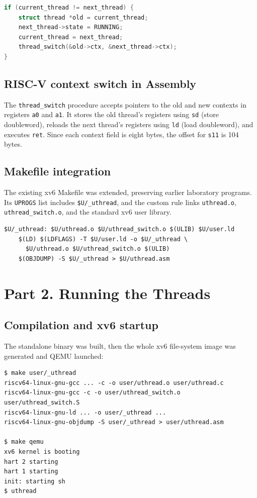 \documentclass[12pt,a4paper]{article}
\begin{document}
\begin{lstlisting}[style=source,language=C]
if (current_thread != next_thread) {
    struct thread *old = current_thread;
    next_thread->state = RUNNING;
    current_thread = next_thread;
    thread_switch(&old->ctx, &next_thread->ctx);
}
\end{lstlisting}

\subsection{RISC-V context switch in Assembly}
The \texttt{thread\_switch} procedure accepts pointers to the old and new contexts in registers \texttt{a0} and \texttt{a1}. It stores the old thread's registers using \texttt{sd} (store doubleword), reloads the next thread's registers using \texttt{ld} (load doubleword), and executes \texttt{ret}. Since each context field is eight bytes, the offset for \texttt{s11} is 104 bytes.



\subsection{Makefile integration}
The existing xv6 Makefile was extended, preserving earlier laboratory programs. Its \texttt{UPROGS} list includes \texttt{\$U/\_uthread}, and the custom rule links \texttt{uthread.o}, \texttt{uthread\_switch.o}, and the standard xv6 user library.

\begin{lstlisting}[style=terminal]
$U/_uthread: $U/uthread.o $U/uthread_switch.o $(ULIB) $U/user.ld
    $(LD) $(LDFLAGS) -T $U/user.ld -o $U/_uthread \
      $U/uthread.o $U/uthread_switch.o $(ULIB)
    $(OBJDUMP) -S $U/_uthread > $U/uthread.asm
\end{lstlisting}

\section{Part 2. Running the Threads}
\subsection{Compilation and xv6 startup}
The standalone binary was built, then the whole xv6 file-system image was generated and QEMU launched:

\begin{lstlisting}[style=terminal]
$ make user/_uthread
riscv64-linux-gnu-gcc ... -c -o user/uthread.o user/uthread.c
riscv64-linux-gnu-gcc -c -o user/uthread_switch.o user/uthread_switch.S
riscv64-linux-gnu-ld ... -o user/_uthread ...
riscv64-linux-gnu-objdump -S user/_uthread > user/uthread.asm

$ make qemu
xv6 kernel is booting
hart 2 starting
hart 1 starting
init: starting sh
$ uthread
\end{lstlisting}
\end{document}
